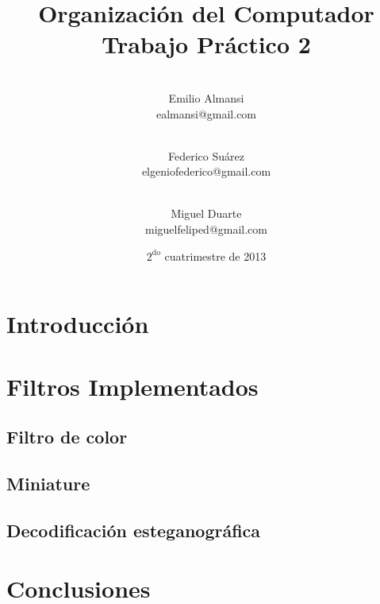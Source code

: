\documentclass[10pt, a4paper]{article}
\newcommand{\RNum}[1]{\uppercase\expandafter{\romannumeral #1\relax}}
\begin{document}
\setlength{\parindent}{25pt}

	
	\thispagestyle{empty}
	\title{%
	\huge{Organización del Computador \RNum{2}}\\
	\vspace{4mm}
	\large{Trabajo Práctico 2}
	}
	\date{\vspace{5mm}$2^{\mathrm{do}}$ cuatrimestre de 2013}

	\author{
		\\
		{\rm Emilio Almansi }\\
		\small{ealmansi@gmail.com}
		\and
		\\
		{\rm Federico Suárez}\\
		\small{elgeniofederico@gmail.com}
		\and
		\\
		{\rm Miguel Duarte}\\
		\small{miguelfeliped@gmail.com}
	} %
	\maketitle

	
	\vspace{10mm}
	\begin{abstract}
	\end{abstract}
	\vspace{10mm}


	\tableofcontents

	\newpage
	\section{Introducción}
		
	\section{Filtros Implementados} %
	\newpage
	\subsection{Filtro de color}
		
	\newpage
	\subsection{Miniature}
		
	\newpage
	\subsection{Decodificación esteganográfica}
		
	\newpage
	\section{Conclusiones}
		

	
\end{document}
